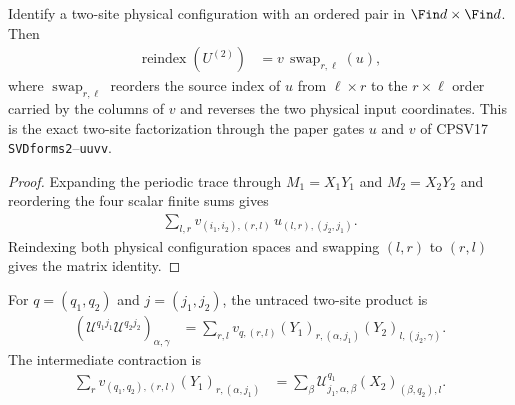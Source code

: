 \begin{lemma}
    \label{thm:mpu_source_gates_two_site_factorization}
    \leanok
    Identify a two-site physical configuration with an ordered pair in
    $\Fin d\times\Fin d$. Then
    \begin{align}
        \operatorname{reindex}(U^{(2)})
         & =v\,\operatorname{swap}_{r,\ell}(u),
    \end{align}
    where $\operatorname{swap}_{r,\ell}$ reorders the source index of $u$ from
    $\ell\times r$ to the $r\times\ell$ order carried by the columns of $v$ and
    reverses the two physical input coordinates. This is the exact two-site
    factorization through the paper gates $u$ and $v$ of CPSV17
    \texttt{SVDforms2}--\texttt{uuvv}.
\end{lemma}

\begin{proof}\leanok
    Expanding the periodic trace through $M_1=X_1Y_1$ and $M_2=X_2Y_2$ and
    reordering the four scalar finite sums gives
    \begin{align}
        \sum_{l,r}v_{(i_1,i_2),(r,l)}\,u_{(l,r),(j_2,j_1)}.
    \end{align}
    Reindexing both physical configuration spaces and swapping $(l,r)$ to
    $(r,l)$ gives the matrix identity.
\end{proof}

\begin{lemma}
    \label{thm:mpu_source_v_open_two_site}
    \leanok
    For $q=(q_1,q_2)$ and $j=(j_1,j_2)$, the untraced two-site product is
    \begin{align}
        (\mathcal U^{q_1j_1}\mathcal U^{q_2j_2})_{\alpha,\gamma}
         & =\sum_{r,l}v_{q,(r,l)}(Y_1)_{r,(\alpha,j_1)}
        (Y_2)_{l,(j_2,\gamma)}.
    \end{align}
    The intermediate contraction is
    \begin{align}
        \sum_r v_{(q_1,q_2),(r,l)}(Y_1)_{r,(\alpha,j_1)}
         & =\sum_\beta \mathcal U^{q_1}_{j_1,\alpha,\beta}
        (X_2)_{(\beta,q_2),l}.
    \end{align}
\end{lemma}

